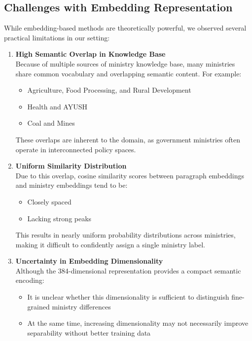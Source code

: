 \documentclass{report}
\begin{document}
\subsection{Challenges with Embedding Representation}
While embedding-based methods are theoretically powerful, we observed several practical limitations in our setting:
\begin{enumerate}
    \item \textbf{High Semantic Overlap in Knowledge Base}\\
        Because of multiple sources of ministry knowledge base, many ministries share common vocabulary and overlapping semantic content. For example:
        \begin{itemize}
            \item Agriculture, Food Processing, and Rural Development
            \item Health and AYUSH
            \item Coal and Mines
        \end{itemize}
        These overlaps are inherent to the domain, as government ministries often operate in interconnected policy spaces.
    \item \textbf{Uniform Similarity Distribution}\\
        Due to this overlap, cosine similarity scores between paragraph embeddings and ministry embeddings tend to be:
        \begin{itemize}
            \item Closely spaced
            \item Lacking strong peaks
        \end{itemize}
        This results in nearly uniform probability distributions across ministries, making it difficult to confidently assign a single ministry label.
    \item \textbf{Uncertainty in Embedding Dimensionality}\\
        Although the 384-dimensional representation provides a compact semantic encoding:
        \begin{itemize}
            \item It is unclear whether this dimensionality is sufficient to distinguish fine-grained ministry differences
            \item At the same time, increasing dimensionality may not necessarily improve separability without better training data
        \end{itemize}

\end{enumerate}
\end{document}
